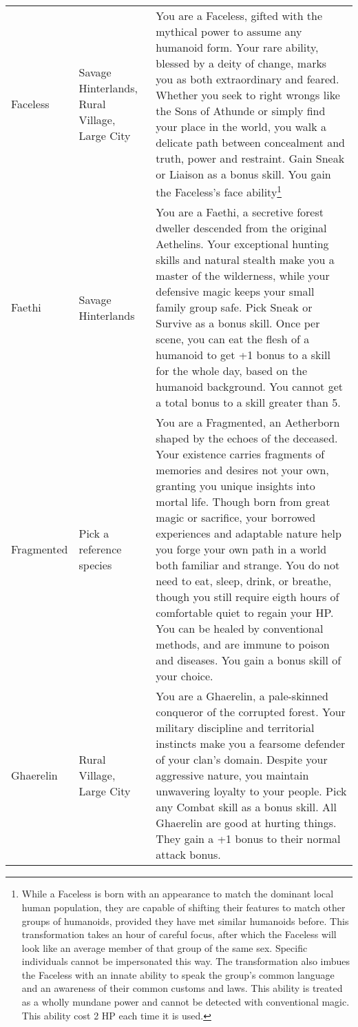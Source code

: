 \documentclass[itdr/core]{subfiles}
\begin{document}
\begin{longtable}{p{}p{}p{}}
Faceless & Savage Hinterlands, Rural Village, Large City & You are a Faceless, gifted with the mythical power to assume
any humanoid form. Your rare ability, blessed by a deity of change, marks you as both extraordinary and feared. Whether
you seek to right wrongs like the Sons of Athunde or simply find your place in the world, you walk a delicate path
between concealment and truth, power and restraint. Gain Sneak or Liaison as a bonus skill. You gain the Faceless's
face ability\footnote{While a Faceless is born with an appearance to match the dominant local human population, they are capable of shifting their features to match other groups of humanoids, provided they have met similar humanoids before. This transformation takes an hour of careful focus, after which the Faceless will look like an average member of that group of the same sex. Specific individuals cannot be impersonated this way. The transformation also imbues the Faceless with an innate ability to speak the group's common language and an awareness of their common customs and laws. This ability is treated as a wholly mundane power and cannot be detected with conventional magic. This ability cost 2 HP each time it is used.} \\

Faethi & Savage Hinterlands & You are a Faethi, a secretive forest dweller descended from the original Aethelins. Your exceptional hunting skills and natural stealth make you a master of the wilderness, while your defensive magic keeps your small family group safe. Pick Sneak or Survive as a bonus skill. Once per scene, you can eat the flesh of a humanoid to get +1 bonus to a skill for the whole day, based on the humanoid background. You cannot get a total bonus to a skill greater than 5. \\

Fragmented & Pick a reference species & You are a Fragmented, an Aetherborn shaped by the echoes of the deceased. Your existence carries fragments of memories and desires not your own, granting you unique insights into mortal life. Though born from great magic or sacrifice, your borrowed experiences and adaptable nature help you forge your own path in a world both familiar and strange. You do not need to eat, sleep, drink, or breathe, though you still require eigth hours of comfortable quiet to regain your HP. You can be healed by conventional methods, and are immune to poison and diseases. You gain a bonus skill of your choice. \\

Ghaerelin & Rural Village, Large City & You are a Ghaerelin, a pale-skinned conqueror of the corrupted forest. Your military discipline and territorial instincts make you a fearsome defender of your clan's domain. Despite your aggressive nature, you maintain unwavering loyalty to your people. Pick any Combat skill as a bonus skill. All Ghaerelin are good at hurting things. They gain a +1 bonus to their normal attack bonus. \\


\end{longtable}
\end{document}
